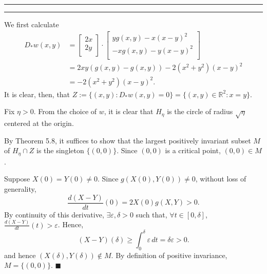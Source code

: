 \documentclass[11pt]{article}
\newcounter{questionCounter}
\newcounter{partCounter}[questionCounter]
\newenvironment{question}[2][\arabic{questionCounter}]{%
    \setcounter{partCounter}{0}%
    \vspace{.25in} \hrule \vspace{0.5em}%
        \noindent{\bf #2}%
    \vspace{0.8em} \hrule \vspace{.10in}%
    \addtocounter{questionCounter}{1}%
}{}
\renewcommand{\qed}{\quad $\blacksquare$}
\newcommand{\R}{\mathbb{R}} %
\newcommand{\e}{\varepsilon} %
\begin{document}
\begin{question}{Problem 3}
We first calculate
\begin{align*}
D_*w(x,y)
 &  =   \begin{bmatrix}
            2x  \\
            2y  \\
        \end{bmatrix}
  \cdot \begin{bmatrix}
            yg(x,y) - x(x - y)^2  \\
           -xg(x,y) - y(x - y)^2  \\
        \end{bmatrix}   \\
 &  = 2xy(g(x,y) - g(x,y)) - 2(x^2 + y^2)(x - y)^2  \\
 &  = - 2(x^2 + y^2)(x - y)^2.
\end{align*}
It is clear, then, that
$Z := \{(x,y) : D_*w(x,y) = 0\} = \{(x,y) \in \R^2 : x = y\}$.

Fix $\eta > 0$. From the choice of $w$, it is clear that $H_{\eta}$ is the
circle of radius $\sqrt{\eta}$ centered at the origin.

By Theorem 5.8, it suffices to show that the largest positively invariant
subset $M$ of $H_{\eta} \cap Z$ is the singleton $\{(0,0)\}$. Since $(0,0)$ is
a critical point, $(0,0) \in M$.

Suppose $X(0) = Y(0) \neq 0$. Since $g(X(0),Y(0)) \neq 0$, without loss of
generality,
\[\frac{d(X - Y)}{dt}(0)
    = 2X(0)g(X,Y) > 0.
\]
By continuity of this derivative, $\exists \e, \delta > 0$ such that,
$\forall t \in [0,\delta]$, $\frac{d(X - Y)}{dt}(t) > \e$. Hence,
\[(X - Y)(\delta) \geq \int_0^{\delta} \e \, dt = \delta\e > 0.\]
and hence $(X(\delta),Y(\delta)) \notin M$. By definition of positive
invariance, $M = \{(0,0)\}$. \qed
\end{question}
\end{document}
